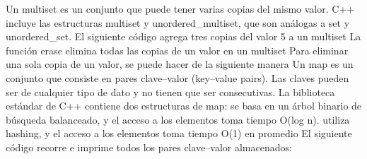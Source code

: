 {}\markdownRendererInterblockSeparator
{}\markdownRendererInterblockSeparator
{}
\markdownRendererSectionEnd \markdownRendererSectionBegin
{}\markdownRendererInterblockSeparator
{}Un multiset es un conjunto que puede tener varias copias del mismo valor.\markdownRendererSoftLineBreak
{}C++ incluye las estructuras multiset y unordered_multiset, que son análogas a set y unordered_set.\markdownRendererParagraphSeparator
{}El siguiente código agrega tres copias del valor 5 a un multiset\markdownRendererInterblockSeparator
{}\markdownRendererInterblockSeparator
{}La función erase elimina todas las copias de un valor en un multiset\markdownRendererInterblockSeparator
{}\markdownRendererInterblockSeparator
{}Para eliminar una sola copia de un valor, se puede hacer de la siguiente manera\markdownRendererInterblockSeparator
{}\markdownRendererParagraphSeparator
{}
\markdownRendererSectionEnd 
\markdownRendererSectionEnd \markdownRendererSectionBegin
{}\markdownRendererInterblockSeparator
{}Un map es un conjunto que consiste en pares clave–valor (key–value pairs). Las claves pueden ser de cualquier tipo de dato y no tienen que ser consecutivas.\markdownRendererParagraphSeparator
{}La biblioteca estándar de C++ contiene dos estructuras de map:\markdownRendererInterblockSeparator
{}\markdownRendererUlBeginTight
\markdownRendererUlItem {} se basa en un árbol binario de búsqueda balanceado, y el acceso a los elementos toma tiempo O(log n).\markdownRendererUlItemEnd 
\markdownRendererUlItem {} utiliza hashing, y el acceso a los elementos toma tiempo O(1) en promedio\markdownRendererUlItemEnd 
\markdownRendererUlEndTight \markdownRendererInterblockSeparator
{}\markdownRendererInterblockSeparator
{}El siguiente código recorre e imprime todos los pares clave–valor almacenados:\markdownRendererInterblockSeparator
